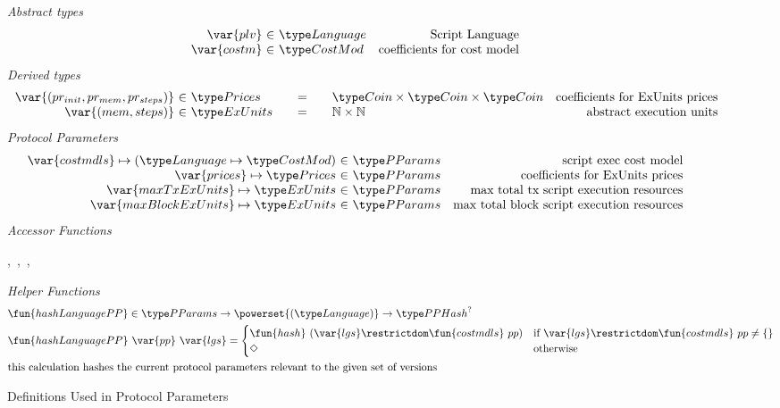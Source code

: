 \begin{figure*}[htb]
  \emph{Abstract types}
  \begin{equation*}
    \begin{array}{r@{~\in~}lr}
      \var{plv} & \Language
      & \text{Script Language}
      \\
      \var{costm} & \CostMod & \text{coefficients for cost model} \\
    \end{array}
  \end{equation*}
  \emph{Derived types}
  \begin{equation*}
    \begin{array}{r@{~\in~}l@{\qquad=\qquad}lr}
      \var{(pr_{init}, pr_{mem}, pr_{steps})}
      & \Prices
      & \Coin \times \Coin \times \Coin
      & \text {coefficients for ExUnits prices}
      \\
      \var{(mem, steps)}
      & \ExUnits
      & \N \times \N
      & \text{abstract execution units} \\
    \end{array}
  \end{equation*}
  \emph{Protocol Parameters}
  \begin{equation*}
      \begin{array}{r@{~\in~}lr}
        \var{costmdls} \mapsto (\Language \mapsto \CostMod) & \PParams & \text{script exec cost model}\\
        \var{prices} \mapsto \Prices & \PParams & \text{coefficients for ExUnits prices} \\
        \var{maxTxExUnits} \mapsto \ExUnits & \PParams & \text{max total tx script execution resources}\\
        \var{maxBlockExUnits} \mapsto \ExUnits & \PParams & \text{max total block script execution resources}\\
      \end{array}
  \end{equation*}
  \emph{Accessor Functions}
  \begin{center}
  ,~,~,~
  \end{center}
  \emph{Helper Functions}
  \begin{align*}
    & \fun{hashLanguagePP} \in \PParams \to \powerset{(\Language)} \to \PPHash^?   \\
    & \fun{hashLanguagePP}~\var{pp}~\var{lgs} = \begin{cases}
         \fun{hash}~(\var{lgs} \restrictdom \fun{costmdls}~{pp})
                           & \text{if~} \var{lgs} \restrictdom \fun{costmdls}~{pp} \neq \{\} \\
              \Nothing & \text{otherwise} \\
      \end{cases} \\
    & \text{this calculation hashes the current protocol parameters relevant to
    the given set of versions}
  \end{align*}
  \caption{Definitions Used in Protocol Parameters}
  \label{fig:defs:protocol-parameters}
\end{figure*}


\clearpage
